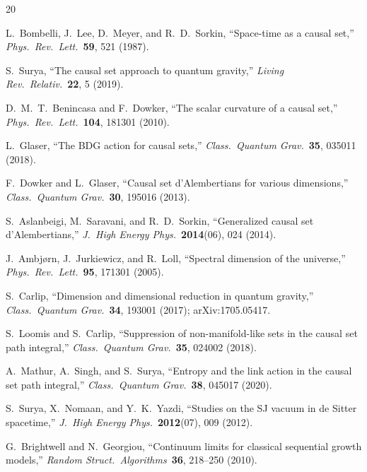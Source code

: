 \documentclass[12pt,a4paper]{article}
\begin{document}
\begin{thebibliography}{20}

L.~Bombelli, J.~Lee, D.~Meyer, and R.~D.~Sorkin,
``Space-time as a causal set,''
\emph{Phys.\ Rev.\ Lett.}\ \textbf{59}, 521 (1987).

S.~Surya,
``The causal set approach to quantum gravity,''
\emph{Living Rev.\ Relativ.}\ \textbf{22}, 5 (2019).

D.~M.~T.~Benincasa and F.~Dowker,
``The scalar curvature of a causal set,''
\emph{Phys.\ Rev.\ Lett.}\ \textbf{104}, 181301 (2010).

L.~Glaser,
``The BDG action for causal sets,''
\emph{Class.\ Quantum Grav.}\ \textbf{35}, 035011 (2018).

F.~Dowker and L.~Glaser,
``Causal set d'Alembertians for various dimensions,''
\emph{Class.\ Quantum Grav.}\ \textbf{30}, 195016 (2013).

S.~Aslanbeigi, M.~Saravani, and R.~D.~Sorkin,
``Generalized causal set d'Alembertians,''
\emph{J.\ High Energy Phys.}\ \textbf{2014}(06), 024 (2014).

J.~Ambj{\o}rn, J.~Jurkiewicz, and R.~Loll,
``Spectral dimension of the universe,''
\emph{Phys.\ Rev.\ Lett.}\ \textbf{95}, 171301 (2005).

S.~Carlip,
``Dimension and dimensional reduction in quantum gravity,''
\emph{Class.\ Quantum Grav.}\ \textbf{34}, 193001 (2017);
arXiv:1705.05417.

S.~Loomis and S.~Carlip,
``Suppression of non-manifold-like sets in the causal set path integral,''
\emph{Class.\ Quantum Grav.}\ \textbf{35}, 024002 (2018).

A.~Mathur, A.~Singh, and S.~Surya,
``Entropy and the link action in the causal set path integral,''
\emph{Class.\ Quantum Grav.}\ \textbf{38}, 045017 (2020).

S.~Surya, X.~Nomaan, and Y.~K.~Yazdi,
``Studies on the SJ vacuum in de Sitter spacetime,''
\emph{J.\ High Energy Phys.}\ \textbf{2012}(07), 009 (2012).

G.~Brightwell and N.~Georgiou,
``Continuum limits for classical sequential growth models,''
\emph{Random Struct.\ Algorithms}\ \textbf{36}, 218--250 (2010).


\end{thebibliography}
\end{document}
